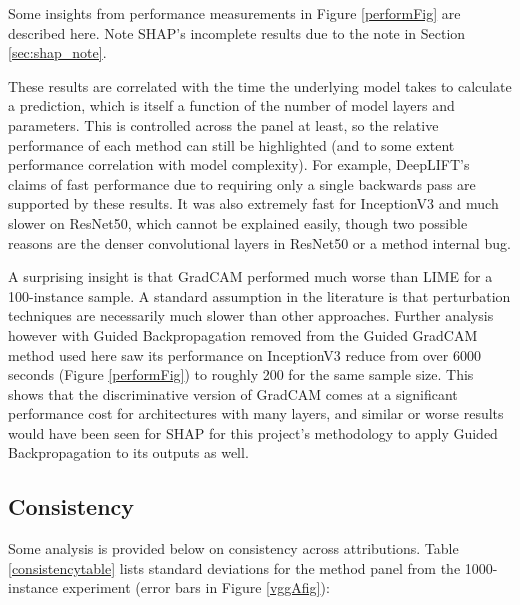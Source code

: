 \documentclass[main]{subfiles}
\begin{document}
Some insights from performance measurements in Figure \ref{performFig} are described here. Note SHAP's incomplete results due to the note in Section \ref{sec:shap_note}.

These results are correlated with the time the underlying model takes to calculate a prediction, which is itself a function of the number of model layers and parameters. This is controlled across the panel at least, so the relative performance of each method can still be highlighted (and to some extent performance correlation with model complexity). For example, DeepLIFT's claims of fast performance due to requiring only a single backwards pass are supported by these results. It was also extremely fast for InceptionV3 and much slower on ResNet50, which cannot be explained easily, though two possible reasons are the denser convolutional layers in ResNet50 or a method internal bug.

A surprising insight is that GradCAM performed much worse than LIME for a 100-instance sample. A standard assumption in the literature is that perturbation techniques are necessarily much slower than other approaches. Further analysis however with Guided Backpropagation removed from the Guided GradCAM method used here saw its performance on InceptionV3 reduce from over 6000 seconds (Figure \ref{performFig}) to roughly 200 for the same sample size. This shows that the discriminative version of GradCAM comes at a significant performance cost for architectures with many layers, and similar or worse results would have been seen for SHAP for this project's methodology to apply Guided Backpropagation to its outputs as well.


\newpage
\subsection{Consistency}\label{sec:consistency}
Some analysis is provided below on consistency across attributions. Table \ref{consistencytable} lists standard deviations for the method panel from the 1000-instance experiment (error bars in Figure \ref{vggAfig}):
\end{document}
